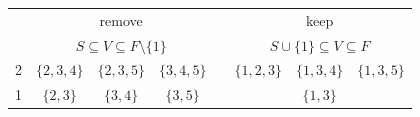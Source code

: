 \documentclass[11pt,a4paper,openright,twoside]{article}
\begin{document}
\begin{table}[h!]
\centering
\begin{tabular}{c|ccccccc}
 & \multicolumn{3}{c}{remove} & & \multicolumn{3}{c}{keep}\\
 & \multicolumn{3}{c}{$S\subseteq V\subseteq F\setminus\{1\}$} & & \multicolumn{3}{c}{$S\cup\{1\}\subseteq V\subseteq F$}\\
\cline{2-4} \cline{6-8}
2 & $\{2,3,4\}$ & $\{2,3,5\}$ & $\{3,4,5\}$ & & $\{1,2,3\}$ & $\{1,3,4\}$ & $\{1,3,5\}$ \\
1 & $\{2,3\}$ & $\{3,4\}$ & $\{3,5\}$ & & & $\{1,3\}$ &  \\
\end{tabular}
\end{table}

\end{document}
